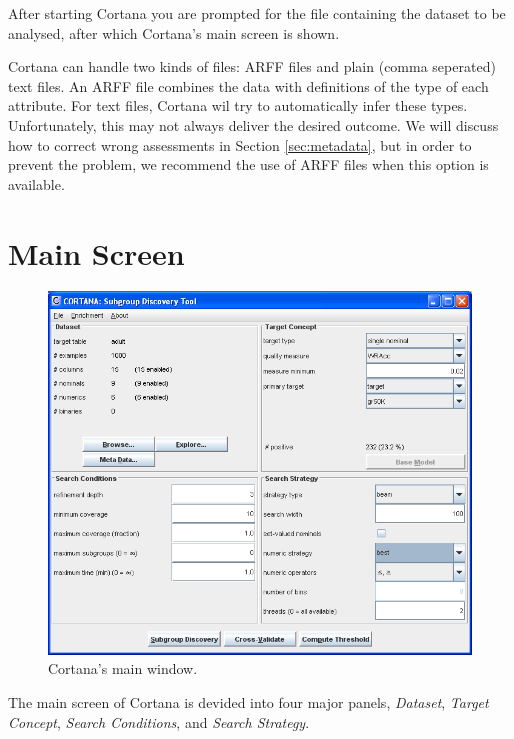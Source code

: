\documentclass{article}
\begin{document}
After starting Cortana you are prompted for the file containing the dataset
to be analysed, after which Cortana's main screen is shown.

Cortana can handle two kinds of files: ARFF files and
plain (comma seperated) text files.  
An ARFF file combines the data with definitions of the \gls{type} of
each attribute.  
For text files, Cortana wil try to automatically infer these \gls{type}s.
Unfortunately, this may not always deliver the desired outcome.  We will
discuss how to correct wrong assessments in Section \ref{sec:metadata}, but
in order to prevent the problem, we recommend the use of ARFF files when
this option is available.

\section{Main Screen}

\begin{figure}
\begin{center}
\includegraphics[width=\textwidth]{mainwindow.png}
\caption{Cortana's main window.}
\label{fig:mainwindow}
\end{center}
\end{figure}

The main screen of Cortana is devided into four major panels, \emph{Dataset}, \emph{Target Concept}, \emph{Search Conditions}, and \emph{Search Strategy}.
\end{document}
